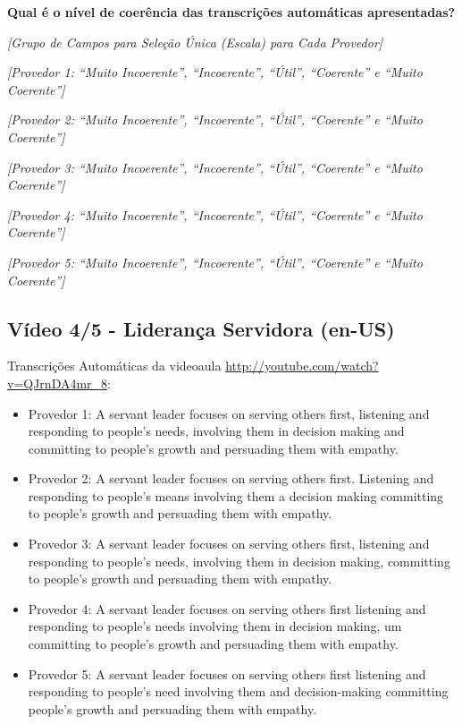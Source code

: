 \noindent
\textbf{Qual é o nível de coerência das transcrições automáticas apresentadas?}

\noindent
\textit{[Grupo de Campos para Seleção Única (Escala) para Cada Provedor]}

\noindent
\textit{[Provedor 1: ``Muito Incoerente'', ``Incoerente'', ``Útil'', ``Coerente'' e ``Muito Coerente'']}

\noindent
\textit{[Provedor 2: ``Muito Incoerente'', ``Incoerente'', ``Útil'', ``Coerente'' e ``Muito Coerente'']}

\noindent
\textit{[Provedor 3: ``Muito Incoerente'', ``Incoerente'', ``Útil'', ``Coerente'' e ``Muito Coerente'']}

\noindent
\textit{[Provedor 4: ``Muito Incoerente'', ``Incoerente'', ``Útil'', ``Coerente'' e ``Muito Coerente'']}

\noindent
\textit{[Provedor 5: ``Muito Incoerente'', ``Incoerente'', ``Útil'', ``Coerente'' e ``Muito Coerente'']}

\subsection{Vídeo 4/5 - Liderança Servidora (en-US)}

\noindent
Transcrições Automáticas da videoaula \url{http://youtube.com/watch?v=QJrnDA4mr_8}:

\begin{itemize}
    \item Provedor 1: A servant leader focuses on serving others first, listening and responding to people's needs, involving them in decision making and committing to people's growth and persuading them with empathy.
    \item Provedor 2: A servant leader focuses on serving others first. Listening and responding to people's means involving them a decision making committing to people's growth and persuading them with empathy.
    \item Provedor 3: A servant leader focuses on serving others first, listening and responding to people's needs, involving them in decision making, committing to people's growth and persuading them with empathy.
    \item Provedor 4: A servant leader focuses on serving others first listening and responding to people's needs involving them in decision making, um committing to people's growth and persuading them with empathy.
    \item Provedor 5: A servant leader focuses on serving others first listening and responding to people's need involving them and decision-making committing people's growth and persuading them with empathy.
\end{itemize}

